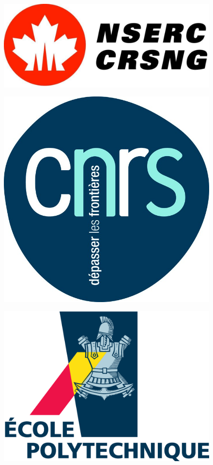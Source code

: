 \documentclass{beamer}
\begin{document}
{\begin{minipage}{0.45\textwidth}
\begin{minipage}{0.45\textwidth}
\begin{figure}
			\centering
			\includegraphics[width=\textwidth]{Figures/logonserc}
		\end{figure}
		\begin{figure}
			\centering
			\includegraphics[width=\textwidth]{Figures/logocnrs}
		\end{figure}
		\begin{figure}
			\centering
			\includegraphics[width=\textwidth]{Figures/logo_X}
		\end{figure}
		\end{minipage}
	\end{minipage}
}
\end{document}
